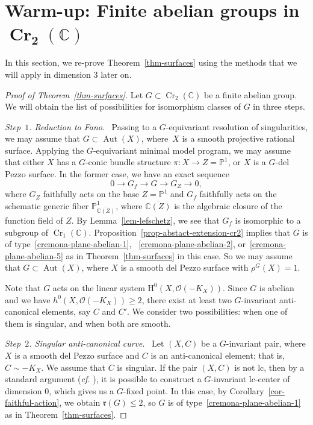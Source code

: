 \documentclass[11pt]{amsart}
\numberwithin{equation}{section}
\theoremstyle{definition}
\theoremstyle{remark}
\newcommand{\OOO}{\mathscr{O}}
\newcommand{\lra}{\longrightarrow}
\DeclareMathOperator{\Cr}{Cr}
\DeclareMathOperator{\Aut}{Aut}
\begin{document}
\section{Warm-up: Finite abelian groups in \texorpdfstring{$\boldsymbol{\Cr_2(\mathbb{C})}$}{Cr\_2(C)}}
\label{sec-warm-up}
In this section, we re-prove Theorem~\ref{thm-surfaces} using the methods that we will apply in dimension $3$ later on. 

\begin{proof}[Proof of Theorem~\ref{thm-surfaces}]
Let $G\subset \Cr_2(\mathbb{C})$ be a finite abelian group. We will obtain the list of possibilities for isomorphism classes of $G$ in three steps. 

\emph{Step~$1$. Reduction to Fano}.~
Passing to a $G$-equivariant resolution of singularities, we may assume that $G\subset \Aut(X)$, where~$X$ is a smooth projective rational surface. Applying the $G$-equivariant minimal model program, we may assume that either $X$ has a $G$-conic bundle structure $\pi\colon X\to Z=\mathbb{P}^1$, or $X$ is a $G$-del Pezzo surface. In the former case, we have an exact sequence
\[
0\lra G_f \lra G\lra G_Z \lra 0, 
\]
where $G_Z$ faithfully acts on the base $Z= \mathbb{P}^1$ and $G_f$ faithfully acts on the schematic generic fiber $\mathbb{P}^1_{\overline{\mathbb{C}(Z)}}$, where $\overline{\mathbb{C}(Z)}$ is the algebraic closure of the function field of $Z$.  By Lemma~\ref{lem-lefschetz}, we see that $G_f$ is isomorphic to a subgroup of $\Cr_1(\mathbb{C})$.  Proposition~\ref{prop-abstact-extension-cr2} implies that $G$ is of type~\eqref{cremona-plane-abelian-1}, ~\eqref{cremona-plane-abelian-2}, or~\eqref{cremona-plane-abelian-5} as in Theorem~\ref{thm-surfaces} in this case. So we may assume that $G\subset \Aut(X)$, where $X$ is a smooth del Pezzo surface with $\rho^G(X)=1$.

Note that $G$ acts on the linear system $\mathrm{H}^0(X, \OOO(-K_X))$. Since $G$ is abelian and we have $h^0(X, \OOO(-K_X))\geq 2$, there exist at least two $G$-invariant anti-canonical elements, say $C$ and $C'$. 
We consider two possibilities: when one of them is singular, and when both are smooth. 

\emph{Step~$2$. Singular anti-canonical curve}.~
Let $(X, C)$ be a $G$-invariant pair, where $X$ is a smooth del Pezzo surface and $C$ is an anti-canonical element; that is, $C\sim -K_X$. We assume that $C$ is singular.  
If the pair $(X, C)$ is not lc, then by a standard argument (\textit{cf.} {\cite[Lemma~2.9]{Pr11}}), 
it is possible to construct a $G$-invariant lc-center of dimension $0$, which gives us a $G$-fixed point. In this case, by Corollary~\ref{cor-faithful-action}, we obtain $\mathfrak{r}(G)\leq 2$, so $G$ is of type~\eqref{cremona-plane-abelian-1} as in Theorem~\ref{thm-surfaces}.


\end{proof}
\end{document}
